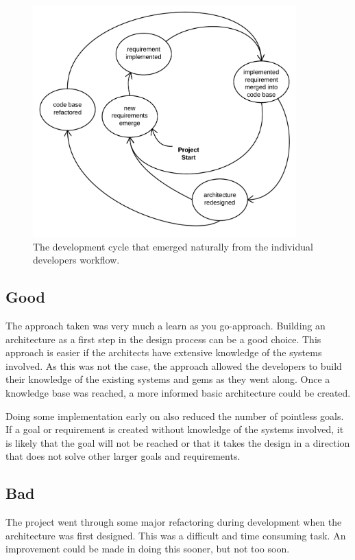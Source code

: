 \begin{figure}[H]
\includegraphics[width=4in]{image/evaluation-development-cycle.png}
\centering
\caption[]{The development cycle that emerged naturally from the individual developers workflow.}
\label{figure:development-cycle}
\end{figure}

\subsection*{Good}
The approach taken was very much a learn as you go-approach. Building an architecture as a first step in the design process can be a good choice. This approach is easier if the architects have extensive knowledge of the systems involved. As this was not the case, the approach allowed the developers to build their knowledge of the existing systems and gems as they went along. Once a knowledge base was reached, a more informed basic architecture could be created.

Doing some implementation early on also reduced the number of pointless goals. If a goal or requirement is created without knowledge of the systems involved, it is likely that the goal will not be reached or that it takes the design in a direction that does not solve other larger goals and requirements.

\subsection*{Bad}
The project went through some major refactoring during development when the architecture was first designed. This was a difficult and time consuming task. An improvement could be made in doing this sooner, but not too soon.

